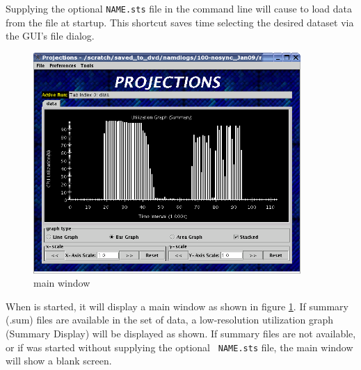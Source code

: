 \documentclass[10pt]{article}
\begin{document}
Supplying the optional {\tt NAME.sts} file in the command line will
cause \projections{} to load data from the file at startup. This shortcut
saves time selecting the desired dataset via the GUI's file dialog.

\begin{figure}[hbt]
\center
\includegraphics[width=4.0in]{fig/front-with-summary}
\caption{\projections{} main window}
\label{mainwindow}
\end{figure}

When \projections{} is started, it will display a main window as shown
in figure \ref{mainwindow}. If summary (.sum) files are available in
the set of data, a low-resolution utilization graph (Summary Display)
will be displayed as shown. If summary files are not available, or if
\projections{} was started without supplying the optional {\tt
NAME.sts} file, the main window will show a blank screen.

\end{document}

